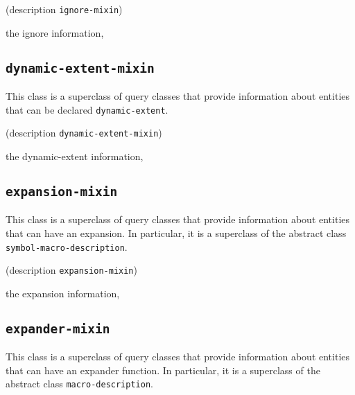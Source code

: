 {\footnotesize
{} {(description {\tt ignore-mixin})}
}

 the ignore information, 

\subsection{\texttt{dynamic-extent-mixin}}
\label{sec-dynamic-extent-mixin}

{\footnotesize
{}
}

This class is a superclass of query classes that provide information
about entities that can be declared \texttt{dynamic-extent}.

{\footnotesize
{}
}

{\footnotesize
{} {(description {\tt dynamic-extent-mixin})}
}

 the dynamic-extent information, 

\subsection{\texttt{expansion-mixin}}
\label{sec-expansion-mixin}

{\footnotesize
{}
}

This class is a superclass of query classes that provide information
about entities that can have an expansion.  In particular, it is a
superclass of the abstract class \texttt{symbol-macro-description}.

{\footnotesize
{}
}

{\footnotesize
{} {(description {\tt expansion-mixin})}
}

 the expansion information, 

\subsection{\texttt{expander-mixin}}
\label{sec-expander-mixin}

{\footnotesize
{}
}

This class is a superclass of query classes that provide information
about entities that can have an expander function.  In particular, it is
a superclass of the abstract class \texttt{macro-description}.

